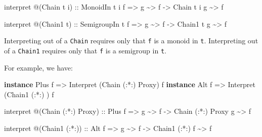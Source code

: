 \documentclass[]{article}
\newenvironment{Shaded}{}{}
\newcommand{\DataTypeTok}[1]{\textcolor[rgb]{0.56,0.13,0.00}{#1}}
\newcommand{\KeywordTok}[1]{\textcolor[rgb]{0.00,0.44,0.13}{\textbf{#1}}}
\newcommand{\NormalTok}[1]{#1}
\newcommand{\OperatorTok}[1]{\textcolor[rgb]{0.40,0.40,0.40}{#1}}
\newcommand{\OtherTok}[1]{\textcolor[rgb]{0.00,0.44,0.13}{#1}}
\begin{document}
\begin{itemize}
\begin{Shaded}
\begin{Highlighting}[]
\NormalTok{interpret }\OperatorTok{@}\NormalTok{(}\DataTypeTok{Chain}\NormalTok{ t i)}
\OtherTok{    ::} \DataTypeTok{MonoidIn}\NormalTok{ t i f}
    \OtherTok{=>}\NormalTok{ g }\OperatorTok{\textasciitilde{}>}\NormalTok{ f}
    \OtherTok{{-}>} \DataTypeTok{Chain}\NormalTok{ t i g }\OperatorTok{\textasciitilde{}>}\NormalTok{ f}

\NormalTok{interpret }\OperatorTok{@}\NormalTok{(}\DataTypeTok{Chain1}\NormalTok{ t)}
\OtherTok{    ::} \DataTypeTok{SemigroupIn}\NormalTok{ t f}
    \OtherTok{=>}\NormalTok{ g }\OperatorTok{\textasciitilde{}>}\NormalTok{ f}
    \OtherTok{{-}>} \DataTypeTok{Chain1}\NormalTok{ t g }\OperatorTok{\textasciitilde{}>}\NormalTok{ f}
\end{Highlighting}
\end{Shaded}

  Interpreting out of a \texttt{Chain} requires only that \texttt{f} is a monoid
  in \texttt{t}. Interpreting out of a \texttt{Chain1} requires only that
  \texttt{f} is a semigroup in \texttt{t}.

  For example, we have:

\begin{Shaded}
\begin{Highlighting}[]
\KeywordTok{instance} \DataTypeTok{Plus}\NormalTok{ f }\OtherTok{=>} \DataTypeTok{Interpret}\NormalTok{ (}\DataTypeTok{Chain}\NormalTok{  (}\OperatorTok{:*:}\NormalTok{) }\DataTypeTok{Proxy}\NormalTok{) f}
\KeywordTok{instance} \DataTypeTok{Alt}\NormalTok{  f }\OtherTok{=>} \DataTypeTok{Interpret}\NormalTok{ (}\DataTypeTok{Chain1}\NormalTok{ (}\OperatorTok{:*:}\NormalTok{)      ) f}

\NormalTok{interpret }\OperatorTok{@}\NormalTok{(}\DataTypeTok{Chain}\NormalTok{ (}\OperatorTok{:*:}\NormalTok{) }\DataTypeTok{Proxy}\NormalTok{)}
\OtherTok{    ::} \DataTypeTok{Plus}\NormalTok{ f}
    \OtherTok{=>}\NormalTok{ g }\OperatorTok{\textasciitilde{}>}\NormalTok{ f}
    \OtherTok{{-}>} \DataTypeTok{Chain}\NormalTok{ (}\OperatorTok{:*:}\NormalTok{) }\DataTypeTok{Proxy}\NormalTok{ g }\OperatorTok{\textasciitilde{}>}\NormalTok{ f}

\NormalTok{interpret }\OperatorTok{@}\NormalTok{(}\DataTypeTok{Chain1}\NormalTok{ (}\OperatorTok{:*:}\NormalTok{))}
\OtherTok{    ::} \DataTypeTok{Alt}\NormalTok{ f}
    \OtherTok{=>}\NormalTok{ g }\OperatorTok{\textasciitilde{}>}\NormalTok{ f}
    \OtherTok{{-}>} \DataTypeTok{Chain1}\NormalTok{ (}\OperatorTok{:*:}\NormalTok{) f }\OperatorTok{\textasciitilde{}>}\NormalTok{ f}


\end{Highlighting}
\end{Shaded}
\end{itemize}
\end{document}
